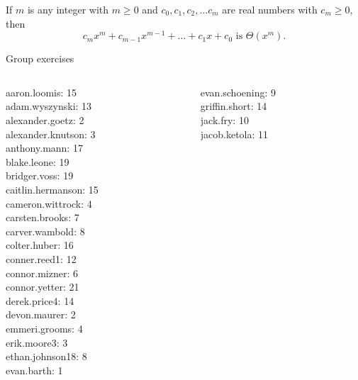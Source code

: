 \documentclass[10pt]{beamer}
\begin{document}
\begin{frame}

\begin{myredbox}[title=\text{Theorem: On Polynomial Orders}]
If $m$ is any integer with $m \geq 0$ and $c_0, c_1, c_2, \hdots c_m$ are real numbers with $c_m \geq 0$, then
\[c_m x^m + c_{m-1} x^{m-1} + \hdots + c_1 x + c_0 \text{ is } \Theta(x^m). \]
\end{myredbox}

\end{frame}




\begin{frame}[standout]
Group exercises
\end{frame}

\begin{frame}
\footnotesize 
\vfill 
\begin{columns}
\begin{column}{0.33\textwidth}
aaron.loomis: 15 \\ 
adam.wyszynski: 13 \\ 
alexander.goetz: 2 \\ 
alexander.knutson: 3 \\ 
anthony.mann: 17 \\ 
blake.leone: 19 \\ 
bridger.voss: 19 \\ 
caitlin.hermanson: 15 \\ 
cameron.wittrock: 4 \\ 
carsten.brooks: 7 \\ 
carver.wambold: 8 \\ 
colter.huber: 16 \\ 
conner.reed1: 12 \\ 
connor.mizner: 6 \\ 
connor.yetter: 21 \\ 
derek.price4: 14 \\ 
devon.maurer: 2 \\ 
emmeri.grooms: 4 \\ 
erik.moore3: 3 \\ 
ethan.johnson18: 8 \\ 
evan.barth: 1 \\\end{column}
\begin{column}{0.33\textwidth}
evan.schoening: 9 \\ 
griffin.short: 14 \\ 
jack.fry: 10 \\ 
jacob.ketola: 11 \\ 

\end{column}
\end{columns}
\end{frame}
\end{document}
